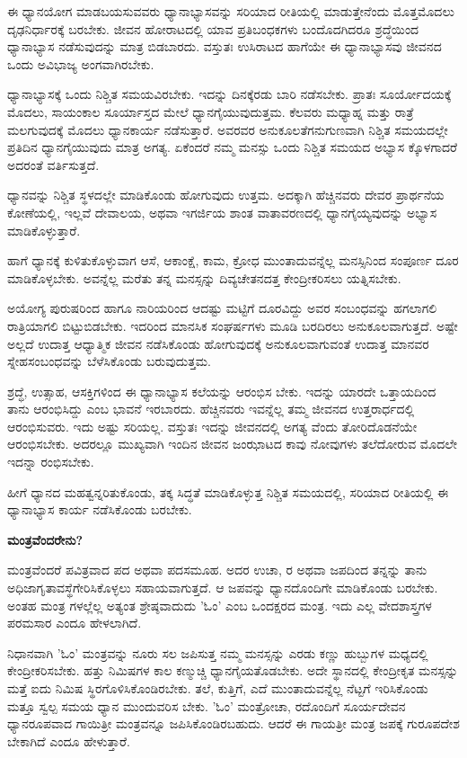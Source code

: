  ಈ ಧ್ಯಾನಯೋಗ ಮಾಡಬಯಸುವವರು ಧ್ಯಾನಾಭ್ಯಾಸವನ್ನು ಸರಿಯಾದ ರೀತಿಯಲ್ಲಿ ಮಾಡುತ್ತೇನೆಂದು ಮೊತ್ತಮೊದಲು ದೃಢನಿರ್ಧಾರಕ್ಕೆ ಬರಬೇಕು. ಜೀವನ ಹೋರಾಟದಲ್ಲಿ ಯಾವ ಪ್ರತಿಬಂಧಕಗಳು ಬಂದೊದಗಿದರೂ ಶ್ರದ್ಧೆಯಿಂದ ಧ್ಯಾನಾಭ್ಯಾಸ ನಡೆಸುವುದನ್ನು ಮಾತ್ರ ಬಿಡಬಾರದು. ವಸ್ತುತಃ ಉಸಿರಾಟದ ಹಾಗೆಯೇ ಈ ಧ್ಯಾನಾಭ್ಯಾಸವು ಜೀವನದ ಒಂದು ಅವಿಭಾಜ್ಯ ಅಂಗವಾಗಿರಬೇಕು.

 ಧ್ಯಾನಾಭ್ಯಾಸಕ್ಕೆ ಒಂದು ನಿಶ್ಚಿತ ಸಮಯವಿರಬೇಕು. ಇದನ್ನು ದಿನಕ್ಕೆರಡು ಬಾರಿ ನಡೆಸಬೇಕು. ಪ್ರಾತಃ ಸೂರ್ಯೋದಯಕ್ಕೆ ಮೊದಲು, ಸಾಯಂಕಾಲ ಸೂರ್ಯಾಸ್ತದ ಮೇಲೆ ಧ್ಯಾನಗೈಯುವುದುತ್ತಮ. ಕೆಲವರು ಮಧ್ಯಾಹ್ನ ಮತ್ತು ರಾತ್ರೆ ಮಲಗುವುದಕ್ಕೆ ಮೊದಲು ಧ್ಯಾನಕಾರ್ಯ ನಡೆಸುತ್ತಾರೆ. ಅವರವರ ಅನುಕೂಲತೆಗನುಗುಣವಾಗಿ ನಿಶ್ಚಿತ ಸಮಯದಲ್ಲೇ ಪ್ರತಿದಿನ ಧ್ಯಾನಗೈಯುವುದು ಮಾತ್ರ ಅಗತ್ಯ. ಏಕೆಂದರೆ ನಮ್ಮ ಮನಸ್ಸು ಒಂದು ನಿಶ್ಚಿತ ಸಮಯದ ಅಭ್ಯಾಸ ಕ್ಕೊಳಗಾದರೆ ಅದರಂತೆ ವರ್ತಿಸುತ್ತದೆ.

 ಧ್ಯಾನವನ್ನು ನಿಶ್ಚಿತ ಸ್ಥಳದಲ್ಲೇ ಮಾಡಿಕೊಂಡು ಹೋಗುವುದು ಉತ್ತಮ. ಅದಕ್ಕಾಗಿ ಹೆಚ್ಚಿನವರು ದೇವರ ಪ್ರಾರ್ಥನೆಯ ಕೋಣೆಯಲ್ಲಿ, ಇಲ್ಲವೆ ದೇವಾಲಯ, ಅಥವಾ ಇಗರ್ಜಿಯ ಶಾಂತ ವಾತಾವರಣದಲ್ಲಿ ಧ್ಯಾನಗೈಯ್ಯವುದನ್ನು ಅಭ್ಯಾಸ ಮಾಡಿಕೊಳ್ಳುತ್ತಾರೆ.

 ಹಾಗೆ ಧ್ಯಾನಕ್ಕೆ ಕುಳಿತುಕೊಳ್ಳುವಾಗ ಆಸೆ, ಆಕಾಂಕ್ಷೆ, ಕಾಮ, ಕ್ರೋಧ ಮುಂತಾದುವನ್ನೆಲ್ಲ ಮನಸ್ಸಿನಿಂದ ಸಂಪೂರ್ಣ ದೂರ ಮಾಡಿಕೊಳ್ಳಬೇಕು. ಅವನ್ನೆಲ್ಲ ಮರೆತು ತನ್ನ ಮನಸ್ಸನ್ನು ದಿವ್ಯಚೇತನದತ್ತ ಕೇಂದ್ರೀಕರಿಸಲು ಯತ್ನಿಸಬೇಕು.

 ಅಯೋಗ್ಯ ಪುರುಷರಿಂದ ಹಾಗೂ ನಾರಿಯರಿಂದ ಆದಷ್ಟು ಮಟ್ಟಿಗೆ ದೂರವಿದ್ದು ಅವರ ಸಂಬಂಧವನ್ನು ಹಗಲಾಗಲಿ ರಾತ್ರಿಯಾಗಲಿ ಬಿಟ್ಟುಬಿಡಬೇಕು. ಇದರಿಂದ ಮಾನಸಿಕ ಸಂಘರ್ಷಗಳು ಮೂಡಿ ಬರದಿರಲು ಅನುಕೂಲವಾಗುತ್ತದೆ. ಅಷ್ಟೇ ಅಲ್ಲದೆ ಉದಾತ್ತ ಆಧ್ಯಾತ್ಮಿಕ ಜೀವನ ನಡೆಸಿಕೊಂಡು ಹೋಗುವುದಕ್ಕೆ ಅನುಕೂಲವಾಗುವಂತೆ ಉದಾತ್ತ ಮಾನವರ ಸ್ನೇಹಸಂಬಂಧವನ್ನು ಬೆಳೆಸಿಕೊಂಡು ಬರುವುದುತ್ತಮ.

 ಶ್ರದ್ಧೆ, ಉತ್ಸಾಹ, ಆಸಕ್ತಿಗಳಿಂದ ಈ ಧ್ಯಾನಾಭ್ಯಾಸ ಕಲೆಯನ್ನು ಆರಂಭಿಸ ಬೇಕು. ಇದನ್ನು ಯಾರದೇ ಒತ್ತಾಯದಿಂದ ತಾನು ಆರಂಭಿಸಿದ್ದು ಎಂಬ ಭಾವನೆ ಇರಬಾರದು. ಹೆಚ್ಚಿನವರು ಇವನ್ನೆಲ್ಲ ತಮ್ಮ ಜೀವನದ ಉತ್ತರಾರ್ಧದಲ್ಲಿ ಆರಂಭಿಸುವರು. ಇದು ಅಷ್ಟು ಸರಿಯಲ್ಲ. ವಸ್ತುತಃ ಇದನ್ನು ಜೀವನದಲ್ಲಿ ಅಗತ್ಯ ವೆಂದು ತೋರಿದೊಡನೆಯೇ ಆರಂಭಿಸಬೇಕು. ಅದರಲ್ಲೂ ಮುಖ್ಯವಾಗಿ ಇಂದಿನ ಜೀವನ ಜಂಝಾಟದ ಕಾವು ನೋವುಗಳು ತಲೆದೋರುವ ಮೊದಲೇ ಇದನ್ನಾ ರಂಭಿಸಬೇಕು.

ಹೀಗೆ ಧ್ಯಾನದ ಮಹತ್ವನ್ನರಿತುಕೊಂಡು, ತಕ್ಕ ಸಿದ್ಧತೆ ಮಾಡಿಕೊಳ್ಳುತ್ತ ನಿಶ್ಚಿತ ಸಮಯದಲ್ಲಿ, ಸರಿಯಾದ ರೀತಿಯಲ್ಲಿ ಈ ಧ್ಯಾನಾಭ್ಯಾಸ ಕಾರ್ಯ ನಡೆಸಿಕೊಂಡು ಬರಬೇಕು.

\textbf{ಮಂತ್ರವೆಂದರೇನು?}

ಮಂತ್ರವೆಂದರೆ ಪವಿತ್ರವಾದ ಪದ ಅಥವಾ ಪದಸಮೂಹ. ಅದರ ಉಚಾ, ರ ಅಥವಾ ಜಪದಿಂದ ತನ್ನನ್ನು ತಾನು ಅಧಿಜಾಗೃತಾವಸ್ಥೆಗೇರಿಸಿಕೊಳ್ಳಲು ಸಹಾಯವಾಗುತ್ತದೆ. ಆ ಜಪವನ್ನು ಧ್ಯಾನದೊಂದಿಗೇ ಮಾಡಿಕೊಂಡು ಬರಬೇಕು. ಅಂತಹ ಮಂತ್ರ ಗಳಲ್ಲೆಲ್ಲ ಅತ್ಯಂತ ಶ್ರೇಷ್ಠವಾದುದು 'ಓಂ' ಎಂಬ ಒಂದಕ್ಷರದ ಮಂತ್ರ. ಇದು ಎಲ್ಲ ವೇದಶಾಸ್ತ್ರಗಳ ಪರಮಸಾರ ಎಂದೂ ಹೇಳಲಾಗಿದೆ.

ನಿಧಾನವಾಗಿ 'ಓಂ' ಮಂತ್ರವನ್ನು ನೂರು ಸಲ ಜಪಿಸುತ್ತ ನಮ್ಮ ಮನಸ್ಸನ್ನು ಎರಡು ಕಣ್ಣು ಹುಬ್ಬುಗಳ ಮಧ್ಯದಲ್ಲಿ ಕೇಂದ್ರೀಕರಿಸಬೇಕು. ಹತ್ತು ನಿಮಿಷಗಳ ಕಾಲ ಕಣ್ಮುಚ್ಚಿ ಧ್ಯಾನಗೈಯತೊಡಬೇಕು. ಅದೇ ಸ್ಥಾನದಲ್ಲಿ ಕೇಂದ್ರೀಕೃತ ಮನಸ್ಸನ್ನು ಮತ್ತೆ ಐದು ನಿಮಿಷ ಸ್ಥಿರಗೊಳಿಸಿಕೊಂಡಿರಬೇಕು. ತಲೆ, ಕುತ್ತಿಗೆ, ಎದೆ ಮುಂತಾದುವನ್ನೆಲ್ಲ ನೆಟ್ಟಗೆ ಇರಿಸಿಕೊಂಡು ಮತ್ತೂ ಸ್ವಲ್ಪ ಸಮಯ ಧ್ಯಾನ ಮುಂದುವರಿಸ ಬೇಕು. 'ಓಂ' ಮಂತ್ರೋಚಾ, ರದೊಂದಿಗೆ ಸೂರ್ಯದೇವನ ಧ್ಯಾನರೂಪವಾದ ಗಾಯಿತ್ರೀ ಮಂತ್ರವನ್ನೂ ಜಪಿಸಿಕೊಂಡಿರಬಹುದು. ಆದರೆ ಈ ಗಾಯತ್ರೀ ಮಂತ್ರ ಜಪಕ್ಕೆ ಗುರೂಪದೇಶ ಬೇಕಾಗಿದೆ ಎಂದೂ ಹೇಳುತ್ತಾರೆ.

